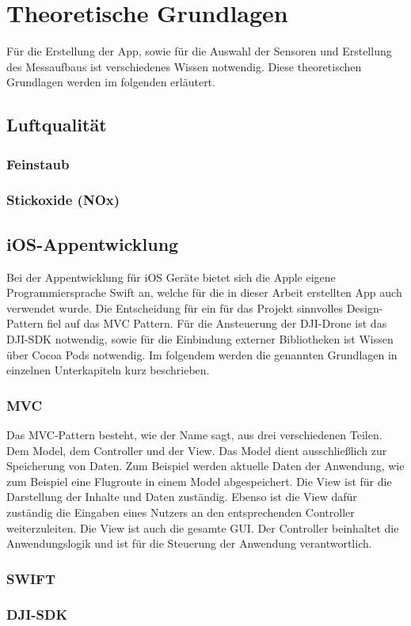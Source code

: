 
\chapter{Theoretische Grundlagen}\label{cha:Grundlagen}
Für die Erstellung der App, sowie für die Auswahl der Sensoren und Erstellung des Messaufbaus ist verschiedenes Wissen notwendig. Diese theoretischen Grundlagen werden im folgenden erläutert. 

\section{Luftqualität}\label{sec:Luftqualität}

\subsection{Feinstaub}\label{subsec:Feinstaub}

\subsection{Stickoxide (NOx)}\label{subsec:NOx}

\section{iOS-Appentwicklung}\label{sec:ioS-Appentwicklung}
Bei der Appentwicklung für iOS Geräte bietet sich die Apple eigene Programmiersprache Swift an, welche für die in dieser Arbeit erstellten App auch verwendet wurde. 
\newline
Die Entscheidung für ein für das Projekt sinnvolles Design-Pattern fiel auf das \acf{MVC} Pattern.
\newline
Für die Ansteuerung der DJI-Drone ist das DJI-SDK notwendig, sowie für die Einbindung externer Bibliotheken ist Wissen über Cocoa Pods notwendig.
\newline
Im folgendem werden die genannten Grundlagen in einzelnen Unterkapiteln kurz beschrieben.

\subsection{\acf{MVC}}\label{subsec:MVC}
Das \acs{MVC}-Pattern besteht, wie der Name sagt, aus drei verschiedenen Teilen. Dem Model, dem Controller und der View.
Das Model dient ausschließlich zur Speicherung von Daten. Zum Beispiel werden aktuelle Daten der Anwendung, wie zum Beispiel eine Flugroute in einem Model abgespeichert.
Die View ist für die Darstellung der Inhalte und Daten zuständig. Ebenso ist die View dafür zuständig die Eingaben eines Nutzers an den entsprechenden Controller weiterzuleiten. Die View ist auch die gesamte \acf{GUI}. 
Der Controller beinhaltet die Anwendungslogik und ist für die Steuerung der Anwendung verantwortlich.
\subsection{SWIFT}\label{subsec:SWIFT}

\subsection{DJI-\acf{SDK}}\label{subsec:DJI-SDK}
